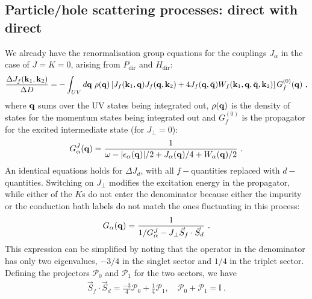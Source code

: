 \subsection{Particle/hole scattering processes: direct with direct}
We already have the renormalisation group equations for the couplings \(J_\alpha\) in the case of \(J=K=0\), arising from \(P_\text{dir}\) and \(H_\text{dir}\):
\begin{equation}\begin{aligned}
	\frac{\Delta J_f({\bf k}_1, {\bf k}_2)}{\Delta D} = -\int_{UV} d{\bf q} ~\rho({\bf q}) \left[J_f({\bf k}_1, {\bf q})J_f({\bf q}, {\bf k}_2) + 4J_f({\bf q}, \bar {\bf q})W_f({\bf k}_1, {\bf q}, \bar {\bf q}, {\bf k}_2)\right] G_f^{(0)}({\bf q})~,
\end{aligned}\end{equation}
where \({\bf q}\) sums over the UV states being integrated out, \(\rho({\bf q})\) is the density of states for the momentum states being integrated out and \(G_f^{(0)}\) is the propagator for the excited intermediate state (for \(J_\perp=0\)):
\begin{equation}\begin{aligned}
	G_\alpha^J({\bf q}) = \frac{1}{\omega - |\epsilon_\alpha({\bf q})| / 2 + J_\alpha({\bf q}) / 4 + W_\alpha({\bf q}) / 2}~.
\end{aligned}\end{equation}
An identical equations holds for \(\Delta J_d\), with all \(f-\)quantities replaced with \(d-\)quantities. Switching on \(J_\perp\) modifies the excitation energy in the propagator, while either of the \(K\)s do not enter the denominator because either the impurity or the conduction bath labels do not match the ones fluctuating in this process:
\begin{equation}\begin{aligned}
	G_\alpha({\bf q}) = \frac{1}{1/G_\alpha^J - J_\perp \vec{S}_f\cdot\vec{S}_d}~.
\end{aligned}\end{equation}
This expression can be simplified by noting that the operator in the denominator has only two eigenvalues, \(-3/4\) in the singlet sector and \(1/4\) in the triplet sector. Defining the projectors \(\mathcal{P}_0\) and \(\mathcal{P}_1\) for the two sectors, we have
\begin{equation}\begin{aligned}
	\vec{S}_f\cdot\vec{S}_d = \frac{-3}{4}\mathcal{P}_0 + \frac{1}{4}\mathcal{P}_1, \quad \mathcal{P}_0 + \mathcal{P}_1 = \mathbb{I}~.
\end{aligned}\end{equation}
